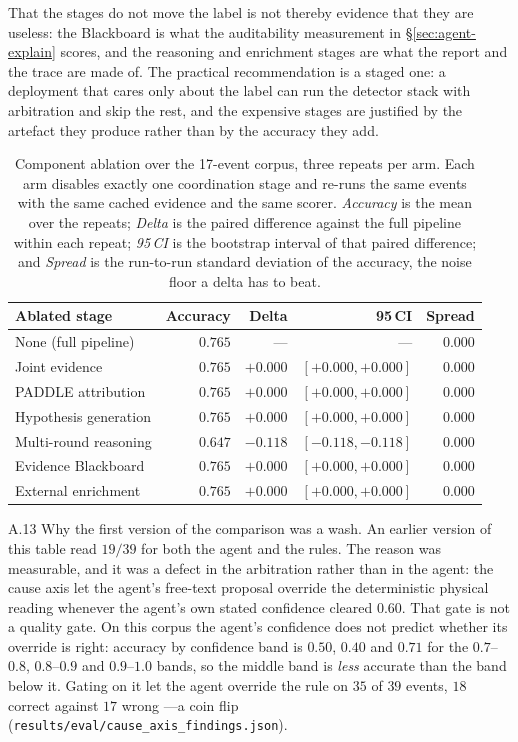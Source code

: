 That the stages do not move the label is not thereby evidence that they
are useless: the Blackboard is what the auditability measurement in
\S\ref{sec:agent-explain} scores, and the reasoning and enrichment stages
are what the report and the trace are made of. The practical
recommendation is a staged one: a deployment that cares only about the
label can run the detector stack with arbitration and skip the rest, and
the expensive stages are justified by the artefact they produce rather
than by the accuracy they add.
\begin{table}[!htbp]
\centering
\caption{Component ablation over the 17-event corpus, three repeats per
arm. Each arm disables exactly one coordination stage and re-runs the same
events with the same cached evidence and the same scorer.
\emph{Accuracy} is the mean over the repeats; \emph{Delta} is the paired
difference against the full pipeline within each repeat;
\emph{95\,CI} is the bootstrap interval of that paired difference; and
\emph{Spread} is the run-to-run standard deviation of the accuracy, the
noise floor a delta has to beat.}
\label{tab:agent-component}
\small
\setlength{\tabcolsep}{3.5pt}
\begin{tabular}{@{}lrrrr@{}}
\hline
\textbf{Ablated stage} & \textbf{Accuracy} & \textbf{Delta} & \textbf{95\,CI}
  & \textbf{Spread} \\
\hline
None (full pipeline)  & $0.765$ & ---      & ---            & $0.000$ \\
Joint evidence        & $0.765$ & $+0.000$ & $[+0.000,+0.000]$ & $0.000$ \\
PADDLE attribution      & $0.765$ & $+0.000$ & $[+0.000,+0.000]$ & $0.000$ \\
Hypothesis generation & $0.765$ & $+0.000$ & $[+0.000,+0.000]$ & $0.000$ \\
Multi-round reasoning & $0.647$ & $-0.118$ & $[-0.118,-0.118]$ & $0.000$ \\
Evidence Blackboard   & $0.765$ & $+0.000$ & $[+0.000,+0.000]$ & $0.000$ \\
External enrichment   & $0.765$ & $+0.000$ & $[+0.000,+0.000]$ & $0.000$ \\
\hline
\end{tabular}
\end{table}

A.13 Why the first version of the comparison was a wash.
\label{app:agent-wash}
An earlier version of this table read $19/39$ for both the agent and the
rules. The reason was measurable, and it was a defect in the arbitration
rather than in the agent: the cause axis let the agent's free-text proposal
override the deterministic physical reading whenever the agent's own stated
confidence cleared $0.60$. That gate is not a quality gate. On this corpus
the agent's confidence does not predict whether its override is right:
accuracy by confidence band is $0.50$, $0.40$ and $0.71$ for the
$0.7$--$0.8$, $0.8$--$0.9$ and $0.9$--$1.0$ bands, so the middle band is
\emph{less} accurate than the band below it. Gating on it let the agent
override the rule on $35$ of $39$ events, $18$ correct against $17$ wrong
---a coin flip (\texttt{results/eval/cause\_axis\_findings.json}).

